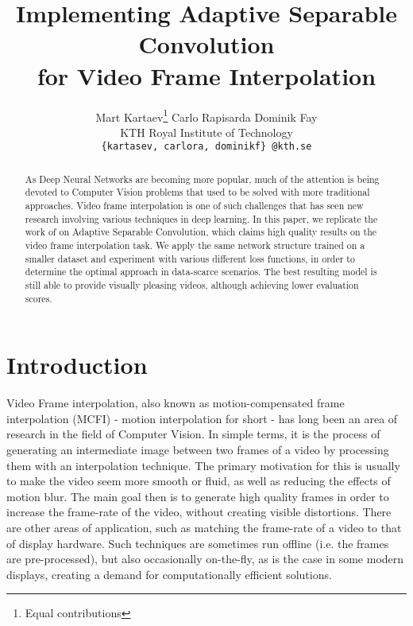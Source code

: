 \documentclass[10pt,twocolumn,letterpaper]{article}
\begin{document}
\title{Implementing Adaptive Separable Convolution\\
for Video Frame Interpolation}


\author{%
Mart Kartaev\thanks{Equal contributions}\qquad%
Carlo Rapisarda\footnotemark[1]\qquad%
Dominik Fay\footnotemark[1]\\
KTH Royal Institute of Technology\\
{\tt\small \{kartasev, carlora, dominikf\} @kth.se}}

\maketitle


\begin{abstract}
\label{sec:abstract}

As Deep Neural Networks are becoming more popular, much of the attention is being devoted to Computer Vision problems that used to be solved with more traditional approaches. Video frame interpolation is one of such challenges that has seen new research involving various techniques in deep learning. In this paper, we replicate the work of \textnormal{\citeauthor{SepConv}} on Adaptive Separable Convolution, which claims high quality results on the video frame interpolation task. We apply the same network structure trained on a smaller dataset and experiment with various different loss functions, in order to determine the optimal approach in data-scarce scenarios. The best resulting model is still able to provide visually pleasing videos, although achieving lower evaluation scores.
\end{abstract}


\section{Introduction}
\label{sec:introduction}

Video Frame interpolation, also known as motion-compensated frame interpolation (MCFI) - motion interpolation for short - has long been an area of research in the field of Computer Vision. In simple terms, it is the process of generating an intermediate image between two frames of a video by processing them with an interpolation technique. The primary motivation for this is usually to make the video seem more smooth or fluid, as well as reducing the effects of motion blur. The main goal then is to generate high quality frames in order to increase the frame-rate of the video, without creating visible distortions. There are other areas of application, such as matching the frame-rate of a video to that of display hardware. Such techniques are sometimes run offline (i.e. the frames are pre-processed), but also occasionally on-the-fly, as is the case in some modern displays, creating a demand for computationally efficient solutions.
\end{document}
